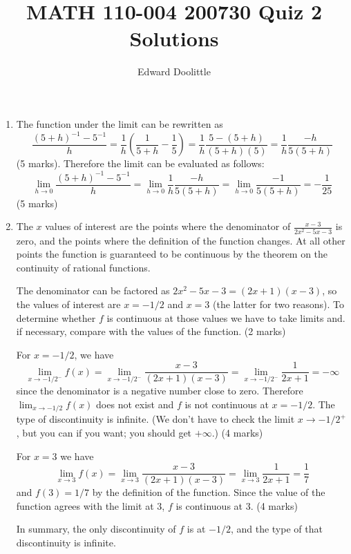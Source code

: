 \documentclass[12pt]{article}
\title{MATH 110-004 200730 Quiz 2 Solutions}
\author{Edward Doolittle}
\newcommand{\ds}{\displaystyle}
\begin{document}
\maketitle

\begin{enumerate}
\item The function under the limit can be rewritten as
  \begin{displaymath}
    \frac{(5+h)^{-1}-5^{-1}}{h}
    = \frac{1}{h} \left(\frac{1}{5+h}-\frac{1}{5}\right)
    = \frac{1}{h} \frac{5-(5+h)}{(5+h)(5)}
    = \frac{1}{h} \frac{-h}{5(5+h)}
  \end{displaymath}
  (5 marks).  Therefore the limit can be evaluated as follows:
  \begin{displaymath}
    \lim_{h\to 0} \frac{(5+h)^{-1}-5^{-1}}{h}
    = \lim_{h\to 0} \frac{1}{h} \frac{-h}{5(5+h)} 
    = \lim_{h\to 0} \frac{-1}{5(5+h)}
    = -\frac{1}{25}
  \end{displaymath}
  (5 marks)
\item The $x$ values of interest are the points where the denominator
  of $\ds \frac{x-3}{2x^2-5x-3}$ is zero, and the points where the definition
  of the function changes.  At all other points the function is guaranteed
  to be continuous by the theorem on the continuity of rational functions.

  The denominator can be factored as $2x^2-5x-3=(2x+1)(x-3)$, so the values
  of interest are $x=-1/2$ and $x=3$ (the latter for two reasons).  To
  determine whether $f$ is continuous at those values we have to take limits
  and. if necessary, compare with the values of the function.
  (2 marks)

  For $x=-1/2$, we have
  \begin{displaymath}
    \lim_{x\to -1/2^-} f(x)
    = \lim_{x\to -1/2^-} \frac{x-3}{(2x+1)(x-3)}
    = \lim_{x\to -1/2^-} \frac{1}{2x+1}
    = -\infty
  \end{displaymath}
  since the denominator is a negative number close to zero.  Therefore
  $\ds\lim_{x\to -1/2} f(x)$ does not exist and $f$ is not continuous
  at $x=-1/2$.  The type of discontinuity is infinite.  (We don't have
  to check the limit $x\to -1/2^+$, but you can if you want; you should
  get $+\infty$.) (4 marks)

  For $x=3$ we have 
  \begin{displaymath}
    \lim_{x\to 3} f(x)
    = \lim_{x\to 3} \frac{x-3}{(2x+1)(x-3)}
    = \lim_{x\to 3} \frac{1}{2x+1}
    = \frac{1}{7}
  \end{displaymath}
  and $f(3) = 1/7$ by the definition of the function.  Since the value
  of the function agrees with the limit at $3$, $f$ is continuous at $3$.
  (4 marks)

  In summary, the only discontinuity of $f$ is at $-1/2$, and the type of
  that discontinuity is infinite.
\end{enumerate}
\end{document}
